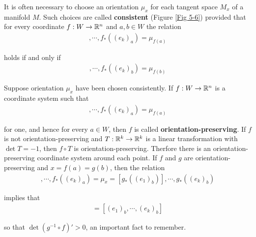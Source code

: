 It is often necessary to choose an orientation $\mu_x$ for each
tangent space $M_x$ of a manifold $M$. Such choices are called
\textbf{consistent} (Figure \ref{Fig 5-6}) provided 
that for every coordinate $f:W\to\mathbb{R}^n$ and $a,b\in W$ the relation 
\begin{align*}
    [f_*((e_1)_a)], \cdots, f_*((e_k)_a) = \mu_{f(a)}
\end{align*}

holds if and only if 
\begin{align*}
    [f_*((e_1)_b)], \cdots, f_*((e_k)_b) = \mu_{f(b)}
\end{align*}

Suppose orientation $\mu_x$ have been chosen consistently. If 
$f:W\to\mathbb{R}^n$ is a coordinate system such that 
\begin{align*}
    [f_*((e_1)_a)], \cdots, f_*((e_k)_a) = \mu_{f(a)}
\end{align*}

for one, and hence for every $a\in W$, then $f$ is called \textbf{orientation-preserving}.
If $f$ is not orientation-preserving and $T:\mathbb{R}^k\to\mathbb{R}^k$ is a linear transformation with 
$\det T=-1$, then $f\circ T$ is orientation-preserving. Therfore there is an orientation-preserving
coordinate system around each point. If $f$ and $g$ are orientation-preserving and $x=f(a)=g(b)$, then 
the relation 
\begin{align*}
    [f_*((e_1)_a)], \cdots, f_*((e_k)_a) 
    = \mu_x
    = [g_*( (e_1)_b)], \cdots, g_*((e_k)_b)
\end{align*}

implies that 
\begin{align*}
    [(g^{-1}\circ f)_*((e_1)_a), \cdots, (g^{-1}\circ f)_*((e_k)_a)] 
    = [(e_1)_b, \cdots, (e_k)_b]
\end{align*}

so that $\det (g^{-1}\circ f)'>0$, an important fact to remember.

